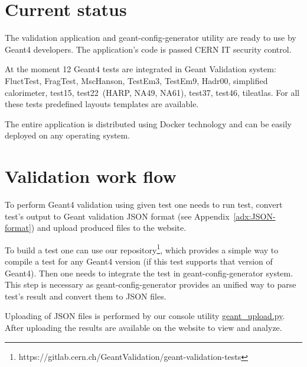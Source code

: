 \section{Current status}
\label{sec-status}

The validation application and geant-config-generator utility are ready to use by Geant4 developers. The application's code is passed CERN IT security control.

At the moment 12 Geant4 tests are integrated in Geant Validation system: FluctTest, FragTest, MscHanson, TestEm3, TestEm9, Hadr00, simplified calorimeter, test15, test22~(HARP, NA49, NA61), test37, test46, tileatlas. For all these tests predefined layouts templates are available.

The entire application is distributed using Docker technology and can be easily deployed on any operating system.

\section{Validation work flow}
\label{sec-workflow}

To perform Geant4 validation using given test one needs to run test, convert test's output to Geant validation JSON format (see Appendix~\ref{adx:JSON-format}) and upload produced files to the website.

To build a test one can use our  repository\footnote{https://gitlab.cern.ch/GeantValidation/geant-validation-tests}, which provides a simple way to compile a test for any Geant4 version (if this test supports that version of Geant4).
Then one needs to integrate the test in geant-config-generator system. This step is necessary as geant-config-generator provides an unified way to parse test's result and convert them to JSON files. 

Uploading of JSON files is performed by our console utility
\href{https://gitlab.cern.ch/GeantValidation/GVP/raw/master/scripts/geant_upload.py}{geant\_upload.py}.
After uploading the results are available on the website to view and analyze.




